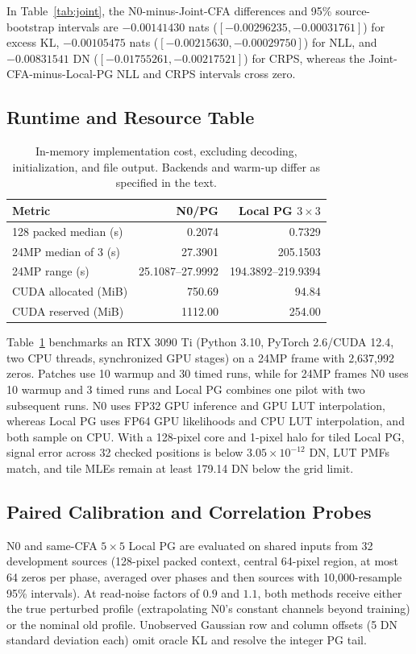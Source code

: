 \documentclass[10pt,twocolumn,journal]{IEEEtran}
\begin{document}
In Table~\ref{tab:joint}, the N0-minus-Joint-CFA differences and 95\% source-bootstrap intervals are $-0.00141430$ nats ($[-0.00296235,-0.00031761]$) for excess KL, $-0.00105475$ nats ($[-0.00215630,-0.00029750]$) for NLL, and $-0.00831541$ DN ($[-0.01755261,-0.00217521]$) for CRPS, whereas the Joint-CFA-minus-Local-PG NLL and CRPS intervals cross zero.

\subsection{Runtime and Resource Table}
\begin{table}[tbp]
\centering
\caption{In-memory implementation cost, excluding decoding, initialization, and file output. Backends and warm-up differ as specified in the text.}
\label{tab:runtime}
\footnotesize
\begin{tabular}{@{}lrr@{}}
\toprule
Metric & N0/PG & Local PG $3\times3$\\
\midrule
128 packed median (s) & 0.2074 & 0.7329\\
24MP median of 3 (s) & 27.3901 & 205.1503\\
24MP range (s) & 25.1087--27.9992 & 194.3892--219.9394\\
CUDA allocated (MiB) & 750.69 & 94.84\\
CUDA reserved (MiB) & 1112.00 & 254.00\\
\bottomrule
\end{tabular}
\end{table}

Table~\ref{tab:runtime} benchmarks an RTX 3090 Ti (Python 3.10, PyTorch 2.6/CUDA 12.4, two CPU threads, synchronized GPU stages) on a 24MP frame with 2,637,992 zeros. Patches use 10 warmup and 30 timed runs, while for 24MP frames N0 uses 10 warmup and 3 timed runs and Local PG combines one pilot with two subsequent runs. N0 uses FP32 GPU inference and GPU LUT interpolation, whereas Local PG uses FP64 GPU likelihoods and CPU LUT interpolation, and both sample on CPU. With a 128-pixel core and 1-pixel halo for tiled Local PG, signal error across 32 checked positions is below $3.05\times10^{-12}$ DN, LUT PMFs match, and tile MLEs remain at least 179.14 DN below the grid limit.

\subsection{Paired Calibration and Correlation Probes}
N0 and same-CFA $5\times5$ Local PG are evaluated on shared inputs from 32 development sources (128-pixel packed context, central 64-pixel region, at most 64 zeros per phase, averaged over phases and then sources with 10,000-resample 95\% intervals). At read-noise factors of $0.9$ and $1.1$, both methods receive either the true perturbed profile (extrapolating N0's constant channels beyond training) or the nominal old profile. Unobserved Gaussian row and column offsets (5 DN standard deviation each) omit oracle KL and resolve the integer PG tail.
\end{document}
